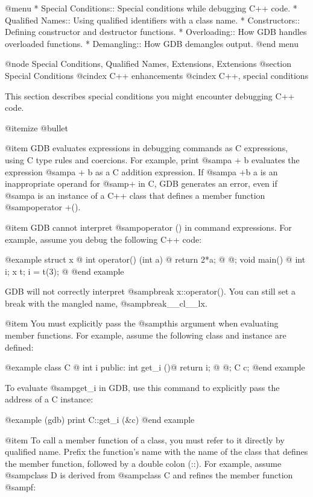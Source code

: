 @menu
* Special Conditions::  Special conditions while debugging C++ code.
* Qualified Names::     Using qualified identifiers with a class name.
* Constructors::        Defining constructor and destructor functions.
* Overloading::         How GDB handles overloaded functions.
* Demangling::          How GDB demangles output.
@end menu

@node Special Conditions, Qualified Names, Extensions, Extensions
@section Special Conditions
@cindex C++ enhancements
@cindex C++, special conditions

This section describes special conditions you might encounter
debugging C++ code.

@itemize @bullet 

@item 
GDB evaluates expressions in debugging commands as C expressions,
using C type rules and coercions. For example, print @samp{a + b}
evaluates the expression @samp{a + b} as a C addition expression. If
@samp{a +b a} is an inappropriate operand for @samp{+} in C, GDB
generates an error, even if @samp{a} is an instance of a C++ class
that defines a member function @samp{operator +()}.

@item 
GDB cannot interpret @samp{operator ()} in command expressions. For
example, assume you debug the following C++ code:

@example
struct x @{ int operator() (int a) @{ return 2*a; @} @};
void main() @{ int i;   x   t;     i = t(3); @}
@end example

GDB will not correctly interpret @samp{break x::operator()}. You can
still set a break with the mangled name, @samp{break__cl__lx}.

@item
You must explicitly pass the @samp{this} argument when evaluating
member functions. For example, assume the following class and instance
are defined:

@example
class C @{
      int i
    public:
      int get_i ()@{
       return i;
      @}
   @};
C c;
@end example

To evaluate @samp{get_i} in GDB, use this command to explicitly pass 
the address of a C instance:

@example
(gdb) print C::get_i (&c) 
@end example

@item
To call a member function of a class, you must refer to it directly by
qualified name. Prefix the function's name with the name of the class
that defines the member function, followed by a double colon (::).
For example, assume @samp{class D} is derived from @samp{class C} and
refines the member function @samp{f}:

